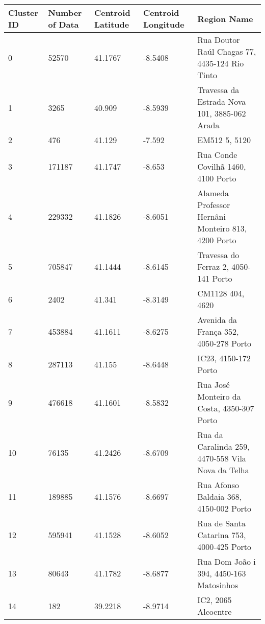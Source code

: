 \documentclass{article}
\begin{document}
\begin{tabular}{ | l | l | l | l | p{3cm} | }
	\hline
	Cluster ID & Number of Data & Centroid Latitude & Centroid Longitude & Region Name \\ \hline
	
	0 &	52570 &	41.1767 & -8.5408 &	Rua Doutor Raúl Chagas 77, 4435-124 Rio Tinto \\ \hline
	
	1 &
	3265 &
	40.909 &
	-8.5939 &
	Travessa da Estrada Nova 101, 3885-062 Arada \\ \hline
	
	2 &
	476 &
	41.129 &
	-7.592 &
	EM512 5, 5120 \\ \hline
	
	3 &
	171187 &
	41.1747 &
	-8.653 &
	Rua Conde Covilhã 1460, 4100 Porto \\ \hline
	
	4 &
	229332 &
	41.1826 &
	-8.6051 &
	Alameda Professor Hernâni Monteiro 813, 4200 Porto \\ \hline
	
	5 &
	705847 &
	41.1444 &
	-8.6145 &
	Travessa do Ferraz 2, 4050-141 Porto \\ \hline
	
	6 &
	2402 &
	41.341 &
	-8.3149 &
	CM1128 404, 4620 \\ \hline
	
	7 &
	453884 &
	41.1611 &
	-8.6275 &
	Avenida da França 352, 4050-278 Porto \\ \hline
	
	8 &
	287113 &
	41.155 &
	-8.6448 &
	IC23, 4150-172 Porto \\ \hline
	
	9 &
	476618 &
	41.1601 &
	-8.5832 &
	Rua José Monteiro da Costa, 4350-307 Porto \\ \hline
	
	10 &
	76135 &
	41.2426 &
	-8.6709 &
	Rua da Caralinda 259, 4470-558 Vila Nova da Telha \\ \hline
	
	11 &
	189885 &
	41.1576 &
	-8.6697 &
	Rua Afonso Baldaia 368, 4150-002 Porto \\ \hline
	
	12 &
	595941 &
	41.1528 &
	-8.6052 &
	Rua de Santa Catarina 753, 4000-425 Porto \\ \hline
	
	13 &
	80643 &
	41.1782 &
	-8.6877 &
	Rua Dom João i 394, 4450-163 Matosinhos \\ \hline
	
	14 &
	182 &
	39.2218 &
	-8.9714 &
	IC2, 2065 Alcoentre \\
	\hline
\end{tabular}
\end{document}
